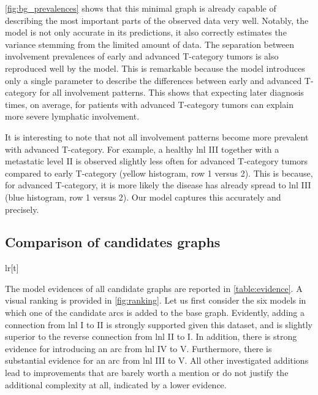 \documentclass[twocolumn]{aastex631}
\begin{document}
\autoref{fig:bg_prevalences} shows that this minimal graph is already capable of describing the most important parts of the observed data very well. Notably, the model is not only accurate in its predictions, it also correctly estimates the variance stemming from the limited amount of data. The separation between involvement prevalences of early and advanced T-category tumors is also reproduced well by the model. This is remarkable because the model introduces only a single parameter to describe the differences between early and advanced T-category for all involvement patterns. This shows that expecting later diagnosis times, on average, for patients with advanced T-category tumors can explain more severe lymphatic involvement.

It is interesting to note that not all involvement patterns become more prevalent with advanced T-category. For example, a healthy \gls{lnl} III together with a metastatic level II is observed slightly less often for advanced T-category tumors compared to early T-category (yellow histogram, row 1 versus 2). This is because, for advanced T-category, it is more likely the disease has already spread to \gls{lnl} III (blue histogram, row 1 versus 2). Our model captures this accurately and precisely.


\subsection{Comparison of candidates graphs}
\label{subsec:results:graph_candidates}

\begin{deluxetable}{lr}[t]
    \startdata
    \enddata
\end{deluxetable}

The model evidences of all candidate graphs are reported in \autoref{table:evidence}. A visual ranking is provided in \autoref{fig:ranking}. Let us first consider the six models in which one of the candidate arcs is added to the base graph. Evidently, adding a connection from \gls{lnl} I to II is strongly supported given this dataset, and is slightly superior to the reverse connection from \gls{lnl} II to I. In addition, there is strong evidence for introducing an arc from \gls{lnl} IV to V. Furthermore, there is substantial evidence for an arc from \gls{lnl} III to V. All other investigated additions lead to improvements that are barely worth a mention or do not justify the additional complexity at all, indicated by a lower evidence. 
\end{document}
